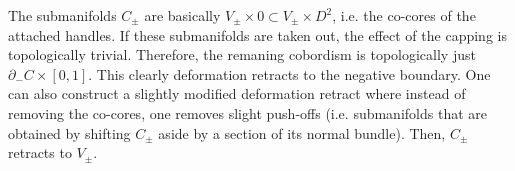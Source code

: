 The submanifolds $C_\pm$ are basically $V_\pm \times 0 \subset V_\pm \times D^2$, i.e. 
the co-cores of the attached handles.
If these submanifolds are taken out, the effect of the capping is topologically trivial.
Therefore, the remaning cobordism is topologically just $\partial_- C\times [0,1]$.
This clearly deformation retracts to the negative boundary.
One can also construct a slightly modified deformation retract where instead 
of removing the co-cores, one removes slight push-offs 
(i.e. submanifolds that are obtained by shifting $C_\pm$ aside by a section of its normal bundle).
Then, $C_\pm$ retracts to $V_\pm$.